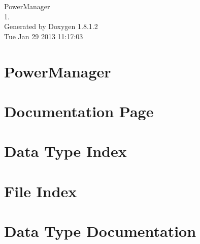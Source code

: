 \documentclass{book}
\begin{document}
\hypersetup{pageanchor=false,citecolor=blue}
\begin{titlepage}
\vspace*{7cm}
\begin{center}
{\Large Power\-Manager \\[1ex]\large 1. }\\
\vspace*{1cm}
{\large Generated by Doxygen 1.8.1.2}\\
\vspace*{0.5cm}
{\small Tue Jan 29 2013 11:17:03}\\
\end{center}
\end{titlepage}
\clearemptydoublepage
{}
\tableofcontents
\clearemptydoublepage
{}
\hypersetup{pageanchor=true,citecolor=blue}
\chapter{Power\-Manager}
\label{index}\hypertarget{index}{}
\chapter{Documentation Page}
\label{A}
\hypertarget{A}{}

\chapter{Data Type Index}

\chapter{File Index}

\chapter{Data Type Documentation}




























\end{document}
